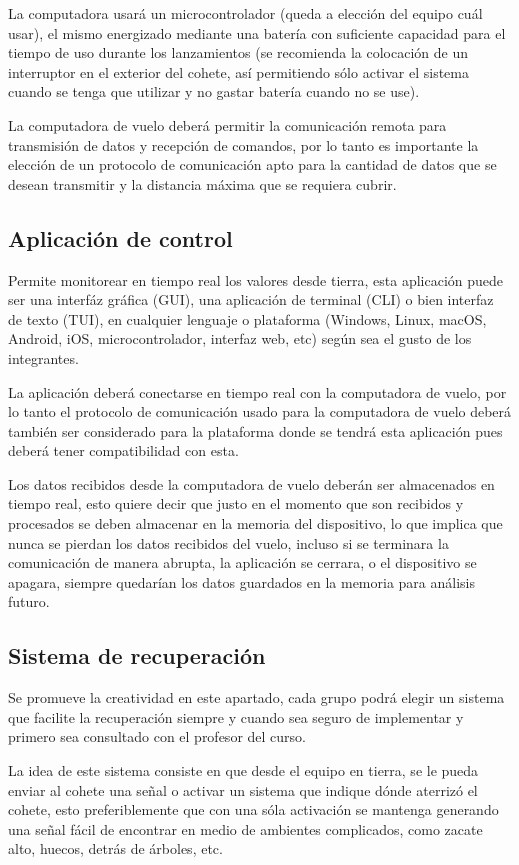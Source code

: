 ﻿\documentclass[letterpaper]{article}
\begin{document}
La computadora usará un microcontrolador (queda a elección del equipo cuál usar), el mismo energizado 
mediante una batería con suficiente capacidad para el tiempo de uso durante los lanzamientos (se
recomienda la colocación de un interruptor en el exterior del cohete, así permitiendo sólo activar 
el sistema cuando se tenga que utilizar y no gastar batería cuando no se use).

La computadora de vuelo deberá permitir la comunicación remota para transmisión de datos y recepción 
de comandos, por lo tanto es importante la elección de un protocolo de comunicación apto para la
cantidad de datos que se desean transmitir y la distancia máxima que se requiera cubrir.

\subsection{Aplicación de control}
Permite monitorear en tiempo real los valores desde tierra, esta aplicación puede ser una interfáz 
gráfica (GUI), una aplicación de terminal (CLI) o bien interfaz de texto (TUI), en cualquier 
lenguaje o plataforma (Windows, Linux, macOS, Android, iOS, microcontrolador, interfaz web, etc)
según sea el gusto de los integrantes.

La aplicación deberá conectarse en tiempo real con la computadora de vuelo, por lo tanto el
protocolo de comunicación usado para la computadora de vuelo deberá también ser considerado para la
plataforma donde se tendrá esta aplicación pues deberá tener compatibilidad con esta.

Los datos recibidos desde la computadora de vuelo deberán ser almacenados en tiempo real, esto
quiere decir que justo en el momento que son recibidos y procesados se deben almacenar en la memoria
del dispositivo, lo que implica que nunca se pierdan los datos recibidos del vuelo, incluso si se 
terminara la comunicación de manera abrupta, la aplicación se cerrara, o el dispositivo se apagara,
siempre quedarían los datos guardados en la memoria para análisis futuro.

\subsection{Sistema de recuperación}
Se promueve la creatividad en este apartado, cada grupo podrá elegir un sistema que facilite la
recuperación siempre y cuando sea seguro de implementar y primero sea consultado con el profesor del
curso.

La idea de este sistema consiste en que desde el equipo en tierra, se le pueda enviar al cohete una
señal o activar un sistema que indique dónde aterrizó el cohete, esto preferiblemente que con una
sóla activación se mantenga generando una señal fácil de encontrar en medio de ambientes
complicados, como zacate alto, huecos, detrás de árboles, etc.
\end{document}
